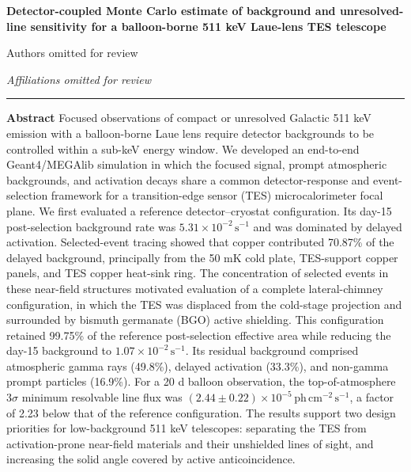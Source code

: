 \documentclass[11pt]{article}
\newcommand{\revblue}[1]{\textcolor{revisionblue}{#1}}
\newcommand{\phcms}{\ensuremath{\,\mathrm{ph\,cm^{-2}\,s^{-1}}}}
\newcommand{\cps}{\ensuremath{\,\mathrm{s^{-1}}}}
\begin{document}
\thispagestyle{fancy}
\begin{flushleft}
{\LARGE\bfseries Detector-coupled Monte Carlo estimate of background and unresolved-line sensitivity for a balloon-borne 511 keV Laue-lens TES telescope\par}
\vspace{1.1em}
{\large Authors omitted for review\par}
\vspace{0.3em}
{\normalsize\itshape Affiliations omitted for review\par}
\end{flushleft}
\vspace{0.7em}
\noindent\rule{\textwidth}{0.4pt}
\vspace{0.5em}

\noindent\textbf{Abstract}\hspace{0.7em}
Focused observations of compact or unresolved Galactic 511 keV emission with a
balloon-borne Laue lens require detector backgrounds to be controlled within a
sub-keV energy window. We developed an end-to-end Geant4/MEGAlib simulation in
which the focused signal, prompt atmospheric backgrounds, and activation decays
share a common detector-response and event-selection framework for a
transition-edge sensor (TES) microcalorimeter focal plane. We first evaluated a
reference detector--cryostat configuration. Its day-15 post-selection
background rate was $5.31\times10^{-2}\cps$ and was dominated by delayed
activation. Selected-event tracing showed that copper contributed 70.87\% of
the delayed background, principally from the 50 mK cold plate, TES-support
copper panels, and TES copper heat-sink ring. The concentration of selected
events in these near-field structures motivated evaluation of a complete
lateral-chimney configuration, in which the TES was displaced from the
cold-stage projection and surrounded by bismuth germanate (BGO) active
shielding. This configuration retained 99.75\% of the reference post-selection
effective area while reducing the day-15 background to
$1.07\times10^{-2}\cps$. Its residual background comprised \revblue{atmospheric
gamma rays} (49.8\%), delayed activation (33.3\%), and non-gamma
prompt particles (16.9\%). For a 20 d balloon observation, the top-of-atmosphere
$3\sigma$ minimum resolvable line flux was
$(2.44\pm0.22)\times10^{-5}\phcms$, a factor of 2.23 below that of the reference
configuration. The results support two design priorities for low-background
511 keV telescopes: separating the TES from activation-prone near-field
materials and their unshielded lines of sight, and increasing the solid angle
covered by active anticoincidence.
\end{document}
